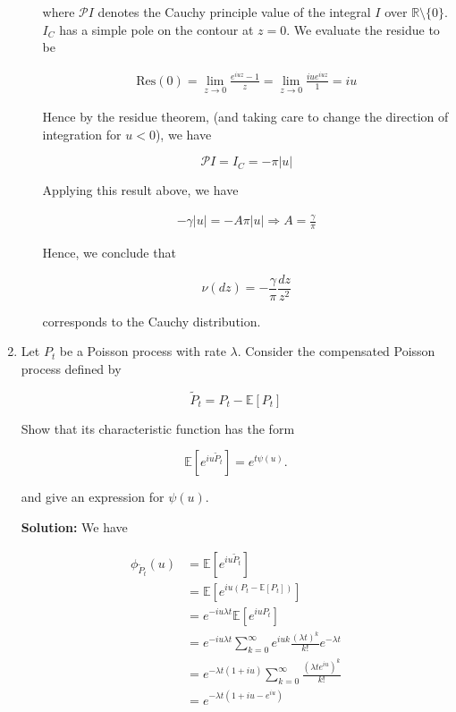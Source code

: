 \documentclass[12pt, a4paper]{article}
\begin{document}
\begin{enumerate}
\begin{enumerate}
            where $\mathcal P I$ denotes the Cauchy principle value of the integral $I$ over $\mathbb R \setminus \{0\}$. $I_C$ has a simple pole on the contour at $z=0$. We evaluate the residue to be 

            \begin{align*}
                \text{Res}(0) = \lim_{z\rightarrow 0} \frac{e^{iuz}-1}{z} = \lim_{z\rightarrow 0} \frac{iu e^{iuz}}{1} = iu
            \end{align*}

            Hence by the residue theorem, (and taking care to change the direction of integration for $u<0$), we have 

            $$\mathcal P I = I_C = -\pi |u|$$

            Applying this result above, we have 

            \begin{align*}
                -\gamma |u| = -A\pi |u| \Rightarrow A=\frac{\gamma}{\pi}
            \end{align*}

            Hence, we conclude that 

            $$\nu(dz) = -\frac{\gamma}{\pi} \frac{dz}{z^2}$$

            corresponds to the Cauchy distribution. 

        \end{enumerate}

        \item Let $P_t$ be a Poisson process with rate $\lambda$. Consider the compensated Poisson process defined by 
        
        $$\tilde P_t = P_t - \mathbb E[P_t]$$

        Show that its characteristic function has the form 
            
        $$\mathbb E \left[e^{iu\tilde P_t} \right] = e^{t\psi(u)}.$$

        and give an expression for $\psi(u)$.

        \textbf{Solution:} We have 

        \begin{align*}
            \phi_{\tilde P_t}(u) &= \mathbb E \left[e^{iu\tilde P_t} \right] \\
            &= \mathbb E \left[e^{iu(P_t - \mathbb E[P_t])} \right] \\
            &= e^{-iu\lambda t} \mathbb E\left[e^{iu P_t} \right] \\
            &= e^{-iu\lambda t} \sum_{k=0}^\infty e^{iuk} \frac{(\lambda t)^k}{k!} e^{-\lambda t} \\
            &= e^{-\lambda t(1+iu)} \sum_{k=0}^\infty \frac{(\lambda t e^{iu})^k}{k!} \\
            &= e^{-\lambda t(1+iu-e^{iu})}
        \end{align*}


\end{enumerate}
\end{document}
